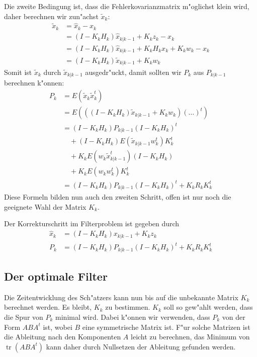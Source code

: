 Die zweite Bedingung ist, dass die Fehlerkovarianzmatrix m"oglichst klein wird,
daher berechnen wir zun"achst $\tilde x_{k}$:
\begin{align*}
\tilde x_{k}&=\hat x_{k}-x_{k}\\
&=(I-K_{k}H_{k})\hat x_{k|k-1}+K_{k}z_{k}-x_{k}\\
&=(I-K_{k}H_{k})\hat x_{k|k-1}+K_{k}H_{k}x_{k}+K_{k}w_k-x_{k}\\
&=(I-K_{k}H_{k})\tilde x_{k|k-1}+K_{k}w_k
\end{align*}
Somit ist $\tilde x_{k}$ durch $\tilde x_{k|k-1}$ ausgedr"uckt, damit sollten
wir $P_{k}$ aus $P_{k|k-1}$ berechnen k"onnen:
\begin{align*}
P_{k}&=E(\tilde x_{k}\tilde x_{k}^t)\\
&=E(
((I-K_{k}H_{k})\tilde x_{k|k-1}+K_{k}w_k)
(\dots)^t
)\\
&=(I-K_{k}H_{k})P_{k|k-1}(I-K_{k}H_{k})^t\\
&\quad +(I-K_{k}H_{k})E(\tilde x_{k|k-1}w_k^t)K_{k}^t\\
&\quad+K_{k}E(w_k\tilde x_{k|k-1}^t)(I-K_{k}H_{k})\\
&\quad+K_{k}E(w_kw_k^t)K_{k}^t\\
&=(I-K_{k}H_{k})P_{k|k-1}(I-K_{k}H_{k})^t +K_{k}R_kK_{k}^t
\end{align*}
Diese Formeln bilden nun auch den zweiten Schritt, offen ist nur noch die
geeignete Wahl der Matrix $K_{k}$.
\begin{definition}
Der Korrekturschritt im Filterproblem ist gegeben durch
\begin{align}
\hat x_{k}&=(I-K_{k}H_{k})x_{k|k-1}+K_{k}z_{k} \label{estimate-correction}\\
P_{k} &=(I-K_{k}H_{k})P_{k|k-1}(I-K_{k}H_{k})^t +K_{k}R_kK_{k}^t \label{covariance-correction}
\end{align}
\end{definition}

\subsection{Der optimale Filter}
Die Zeitentwicklung des Sch"atzers kann nun bis auf die unbekannte Matrix $K_k$
berechnet werden. Es bleibt, $K_k$ zu bestimmen. $K_k$ soll so gew"ahlt werden,
dass die Spur von $P_{k}$ minimal wird. Dabei k"onnen wir verwenden,
dass $P_{k}$ von der Form $ABA^t$ ist, wobei $B$ eine symmetrische
Matrix ist. F"ur solche Matrizen ist die Ableitung nach den Komponenten
$A$ leicht zu berechnen, das Minimum von $\operatorname{tr}(ABA^t)$
kann daher durch Nullsetzen der Ableitung gefunden werden.

